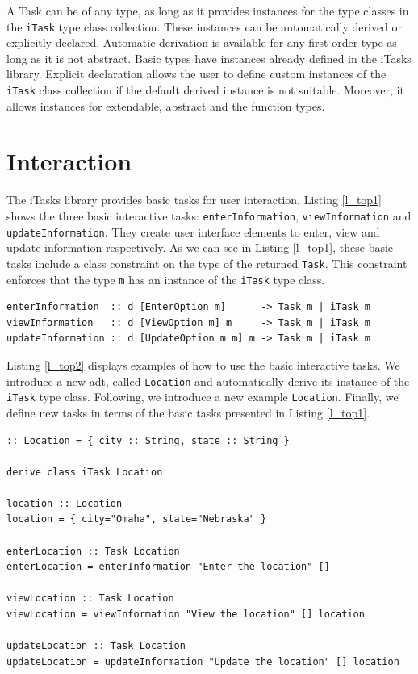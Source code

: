 A Task can be of any type, as long as it provides instances for the type classes in the \texttt{iTask} type class collection. These instances can be automatically derived or explicitly declared. Automatic derivation is available for any first-order type as long as it is not abstract. Basic types have instances already defined in the iTasks library. Explicit declaration allows the user to define custom instances of the \texttt{iTask} class collection if the default derived instance is not suitable. Moreover, it allows instances for extendable, abstract and the function types. 

\section{Interaction}\label{interaction}

The iTasks library provides basic tasks for user interaction. Listing \ref{l_top1} shows the three basic interactive tasks: \texttt{enterInformation}, \texttt{viewInformation} and \texttt{updateInformation}. They create user interface elements to enter, view and update information respectively. As we can see in Listing \ref{l_top1}, these basic tasks include a class constraint on the type of the returned \texttt{Task}. This constraint enforces that the type \texttt{m} has an instance of the \texttt{iTask} type class. 

\begin{lstlisting}[caption=iTasks basic interaction functions,captionpos=b,label=l_top1]
enterInformation  :: d [EnterOption m]      -> Task m | iTask m
viewInformation   :: d [ViewOption m] m     -> Task m | iTask m
updateInformation :: d [UpdateOption m m] m -> Task m | iTask m 
\end{lstlisting}


Listing \ref{l_top2} displays examples of how to use the basic interactive tasks. We introduce a new \ac{adt}, called \texttt{Location} and automatically derive its instance of the \texttt{iTask} type class. Following, we introduce a new example \texttt{Location}. Finally, we define new tasks in terms of the basic tasks presented in Listing \ref{l_top1}. 


\begin{lstlisting}[caption=Example of basic iTasks interaction functions,captionpos=b,label=l_top2]
:: Location = { city :: String, state :: String }

derive class iTask Location

location :: Location
location = { city="Omaha", state="Nebraska" }

enterLocation :: Task Location
enterLocation = enterInformation "Enter the location" []

viewLocation :: Task Location
viewLocation = viewInformation "View the location" [] location

updateLocation :: Task Location
updateLocation = updateInformation "Update the location" [] location
\end{lstlisting}

